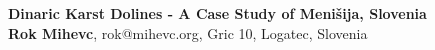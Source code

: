\documentclass[a0,portrait]{a0poster}
\begin{document}


\begin{minipage}[b]{1\linewidth}
\veryHuge \color{Black} \textbf{Dinaric Karst Dolines - A Case Study of Menišija, Slovenia} \color{Black}\\ %
\centering
\Large \textbf{Rok Mihevc}, rok@mihevc.org, Gric 10, Logatec, Slovenia %
\end{minipage}
%

\end{document}
